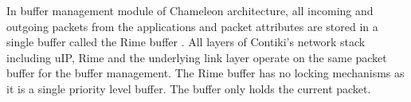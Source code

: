 





In buffer management module of Chameleon architecture, all incoming and outgoing packets from the applications and packet attributes are stored in a single buffer called the Rime buffer \cite{uip, rime, rimeposter, contiki}. All layers of Contiki's network stack including uIP, Rime and the underlying link layer operate on the same packet buffer for the buffer management. The Rime buffer has no locking mechanisms as it is a single priority level buffer. The buffer only holds the current packet.

